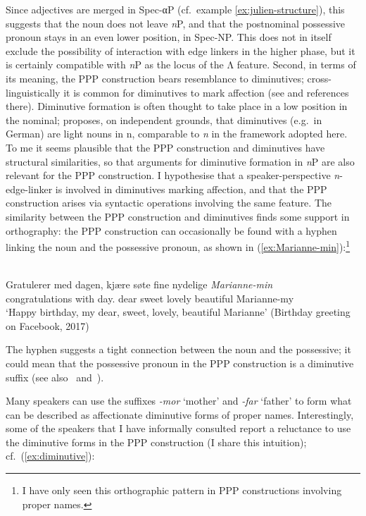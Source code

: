\documentclass[output=paper]{langsci/langscibook}
\begin{document}
\noindent Since adjectives are merged in Spec-αP (cf.\ example
\ref{ex:julien-structure}), this suggests that the noun does not leave
\emph{n}P, and that the postnominal possessive pronoun stays in an even lower
position, in Spec-NP.  This does not in itself  exclude the possibility of
interaction with edge linkers in the higher phase, but it is certainly
compatible with \emph{n}P as  the locus of the
\textsc{Λ} feature.  Second, in terms
of its meaning, the PPP construction bears  resemblance to diminutives;
cross-linguistically it is common for diminutives to mark affection  (see
\citealt{jurafsky1996diminutives} and references there).  Diminutive
formation is often thought to take place in a low position in the nominal;
\citet{wiltschko2006diminutives} proposes, on independent grounds, that
diminutives (e.g.\ in German) are light nouns in n, comparable to \emph{n} in
the framework adopted here. To me it seems plausible that the PPP construction
and diminutives have structural similarities, so that arguments for diminutive
formation in \emph{n}P are also relevant for the PPP construction. I
hypothesise that a speaker-perspective
\emph{n}-edge-linker is involved in diminutives marking affection, and  that
the PPP construction arises via syntactic operations involving the same
feature. The similarity between the PPP construction and diminutives finds some
support in orthography: the PPP construction can occasionally  be found with a
hyphen linking the noun and the possessive pronoun, as shown in
(\ref{ex:Marianne-min}):\footnote{I have only seen this orthographic pattern in
PPP constructions involving proper names.}

\ea\label{ex:Marianne-min} \\
	\gll 	Gratulerer med dagen, kjære søte fine nydelige \textit{Marianne-min}\\
	congratulations with day.\Def{} dear sweet lovely beautiful Marianne-my\\
	\glt `Happy birthday, my dear, sweet, lovely, beautiful Marianne'
	 (Birthday greeting on Facebook, 2017)
\z

\noindent The hyphen suggests a tight connection between the noun and the
possessive; it could mean that the possessive pronoun in the \gls{PPP} construction
is a diminutive suffix (see also~\citealt{Lodrup2011}
and~\citealt{Svenonius2017}).

Many  speakers can use the suffixes \emph{-mor} `mother' and
\emph{-far} `father' to  form what can be described as affectionate diminutive
forms of proper names. Interestingly, some of the speakers that I have
informally consulted  report a reluctance to use the diminutive forms in the
PPP construction (I share this intuition); cf.\
(\ref{ex:diminutive}):
\end{document}
